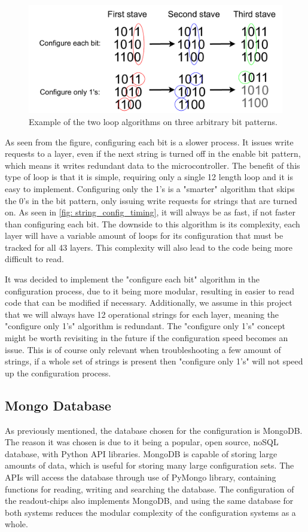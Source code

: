 \documentclass[main.tex]{subfiles}
\begin{document}
\begin{figure}[!ht]
    \centering
    \includegraphics[width=13cm, scale=1.5]{images/string_config_timing.pdf}
    \caption{Example of the two loop algorithms on three arbitrary bit patterns.}
    \label{fig: string_config_timing}
\end{figure}

As seen from the figure, configuring each bit is a slower process. It issues write requests to a layer, even if the next string is turned off in the enable bit pattern, which means it writes redundant data to the microcontroller. The benefit of this type of loop is that it is simple, requiring only a single 12 length loop and it is easy to implement.  Configuring only the 1's is a "smarter" algorithm that skips the 0's in the bit pattern, only issuing write requests for strings that are turned on. As seen in \autoref{fig: string_config_timing}, it will always be as fast, if not faster than configuring each bit. The downside to this algorithm is its complexity, each layer will have a variable amount of loops for its configuration that must be tracked for all 43 layers. This complexity will also lead to the code being more difficult to read.

It was decided to implement the "configure each bit" algorithm in the configuration process, due to it being more modular, resulting in easier to read code that can be modified if necessary. Additionally, we assume in this project that we will always have 12 operational strings for each layer, meaning the "configure only 1's" algorithm is redundant. The "configure only 1's" concept might be worth revisiting in the future if the configuration speed becomes an issue. This is of course only relevant when troubleshooting a few amount of strings, if a whole set of strings is present then "configure only 1's" will not speed up the configuration process.

\subsection{Mongo Database}
\label{ssec: mongo}
As previously mentioned, the database chosen for the configuration is MongoDB. The reason it was chosen is due to it being a popular, open source, noSQL database, with Python API libraries. MongoDB is capable of storing large amounts of data, which is useful for storing many large configuration sets. The APIs will access the database through use of PyMongo library, containing functions for reading, writing and searching the database. The configuration of the readout-chips also implements MongoDB, and using the same database for both systems reduces the modular complexity of the configuration systems as a whole.
\end{document}
